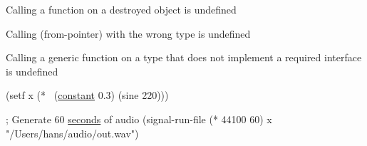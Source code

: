 \begin{DoxyItemize}
\item Calling a function on a destroyed object is undefined
\item Calling (from-\/pointer) with the wrong type is undefined
\item Calling a generic function on a type that does not implement a required interface is undefined
\end{DoxyItemize}


\begin{DoxyCode}
(setf x (*~ (\hyperlink{util_8h_aa8e9443eab9b01139ff3abfc68cd22ed}{constant} 0.3) 
            (sine 220)))

; Generate 60 \hyperlink{util_8h_a1a3cd4cff330c981ed89bbd3a3426273}{seconds} of audio
(signal-run-file (* 44100 60) x \textcolor{stringliteral}{"/Users/hans/audio/out.wav"}) 
\end{DoxyCode}
 